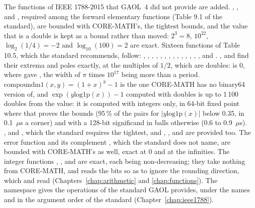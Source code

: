 \documentclass[12pt,a4paper,twoside,openright]{book}
\begin{document}
\medskip
The functions of IEEE 1788-2015 that GAOL~4 did not provide are
added.\newinvfive{} , ,  and ,
required among the forward elementary functions (Table 9.1 of the standard),
are bounded with CORE-MATH's, the tightest bounds, and the value that is a
double is kept as a bound rather than moved: $2^3 = 8$, $10^{22}$,
$\log_2(1/4) = -2$ and $\log_{10}(100) = 2$ are exact. Sixteen functions of
Table 10.5, which the standard recommends, follow: ,
, , , , ,
, , , , ,
, , ,  and
. ,  and  find their
extrema and poles exactly, at the multiples of $1/2$, which are doubles:
 is 0, where  gave , the
width of $\pi$ times $10^{17}$ being more than a period.
$\mathrm{compoundm1}(x, y) = (1 + x)^y - 1$ is the one CORE-MATH has no
binary64 version of, and $\exp(y \mathrm{log1p}(x)) - 1$ computed with
doubles is up
to 1\,100 doubles from the value: it is computed with integers only, in
64-bit fixed point where that proves the bounds (95\,\% of the pairs for
$|y \mathrm{log1p}(x)|$ below 0.35, in 0.1~$\mu$s a corner) and with a 128-bit
significand in balls otherwise (0.6 to 0.9~$\mu$s). ,
 and , which the standard requires the
tightest, and , ,  and
 are provided too. The error function  and
its complement , which the standard does not name, are bounded
with CORE-MATH's as well, exact at 0 and at the infinities. The integer
functions , ,  and
 are exact, each being non-decreasing; they take
nothing from CORE-MATH, and  reads the bits so as
to ignore the rounding direction, which  and
 read (Chapters~\ref{chap:arithmetic} and
\ref{chap:functions}). The namespace  gives the
operations of the standard GAOL provides, under the names and in the argument
order of the standard (Chapter~\ref{chap:ieee1788}).
\end{document}

